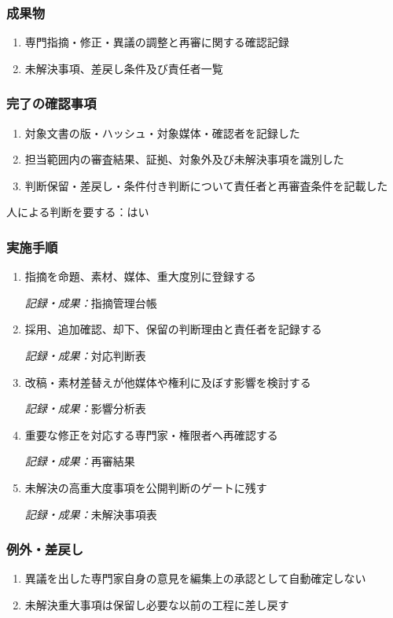 \documentclass[a4paper,11pt]{article}
\begin{document}
\subsubsection*{成果物}
\begin{enumerate}[leftmargin=2em,itemsep=0.35em]
\item 専門指摘・修正・異議の調整と再審に関する確認記録
\item 未解決事項、差戻し条件及び責任者一覧
\end{enumerate}
\subsubsection*{完了の確認事項}
\begin{enumerate}[leftmargin=2em,itemsep=0.35em]
\item 対象文書の版・ハッシュ・対象媒体・確認者を記録した
\item 担当範囲内の審査結果、証拠、対象外及び未解決事項を識別した
\item 判断保留・差戻し・条件付き判断について責任者と再審査条件を記載した
\end{enumerate}
\par 人による判断を要する：はい\par\medskip
\subsubsection*{実施手順}
\begin{enumerate}[leftmargin=2em,itemsep=0.65em]
\item 指摘を命題、素材、媒体、重大度別に登録する\par\noindent\textit{記録・成果：}指摘管理台帳\nobreak\smallskip
\item 採用、追加確認、却下、保留の判断理由と責任者を記録する\par\noindent\textit{記録・成果：}対応判断表\nobreak\smallskip
\item 改稿・素材差替えが他媒体や権利に及ぼす影響を検討する\par\noindent\textit{記録・成果：}影響分析表\nobreak\smallskip
\item 重要な修正を対応する専門家・権限者へ再確認する\par\noindent\textit{記録・成果：}再審結果\nobreak\smallskip
\item 未解決の高重大度事項を公開判断のゲートに残す\par\noindent\textit{記録・成果：}未解決事項表\nobreak\smallskip
\end{enumerate}
\subsubsection*{例外・差戻し}
\begin{enumerate}[leftmargin=2em,itemsep=0.35em]
\item 異議を出した専門家自身の意見を編集上の承認として自動確定しない
\item 未解決重大事項は保留し必要な以前の工程に差し戻す
\end{enumerate}
\end{document}
